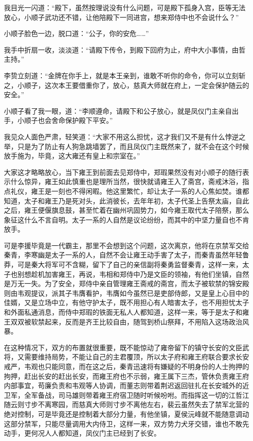 我目光一闪道：“殿下，虽然按理说没有什么问题，可是殿下孤身入宫，臣等无法放心，小顺子武功还不错，让他陪殿下一同进宫，想来郑侍中也不会说什么？”

小顺子脸色一边，脱口道：“公子，你的安危……”

我手中折扇一收，淡淡道：“请殿下传令，到殿下回府为止，府中大小事情，由哲主持。”

李贽立刻道：“金牌在你手上，就是本王亲到，谁敢不听你的命令，你可以立刻斩之，小顺子，这次本王要借重你了，放心，慈真大师就在府上，一定会保护随云的安全。”

小顺子看了我一眼，道：“李顺遵命，请殿下和公子放心，就是凤仪门主亲自出手，小顺子也会舍命保护殿下平安。”

我见众人面色严肃，轻笑道：“大家不用这么担忧，这才我们又不是有什么悖逆之举，只是为了防止有人狗急跳墙罢了，而且凤仪门主既然来了，就不会在这个时候放手施为，毕竟，这大雍还有皇上和宗室在。”

大家这才略略放心，当下雍王到前面去见郑侍中，郑瑕果然没有对小顺子的随行表示什么惊异，雍王如此慎重也是理所当然，很快就请雍王入了斋宫，斋戒沐浴，指点礼仪，雍王是一刻也不得闲暇。他这里繁忙，却让太子一系的人心焦如焚。谁都知道，太子和雍王乃是死对头，此消彼长，去年年初，太子代圣上告祭太庙，自此之后，雍王便偃旗息鼓，甚至忙着在幽州巩固势力，如今雍王取代太子陪祭，那么象征这什么不言自明。太子一系的人自然是议论纷纷，而其中的中坚力量自也不肯放手。

可是李援毕竟是一代霸主，那里不会想到这个问题，这次离京，他将在京禁军交给秦青，李寒幽是太子一系的人，自然不会让雍王动手害了太子，而秦青虽然年轻鲁莽，可是秦大将军可不含糊，留下了自己的亲信副将秦勇监督秦青，这样一来，太子也别想趁机加害雍王，再说，韦相和郑侍中乃是文臣的领袖，有他们坐镇，自然是万无一失。为了安全，郑侍中亲自管理雍王斋戒的斋宫，而太子被软禁的锦安殿则由韦观提议，派其子韦膺看护，韦膺如今虽然已是吏部侍郎，又是皇上心目中的佳婿，又是立场中立，有他守护太子，既不用担心有人暗害太子，也不用担忧太子和外面私通消息，而侍中郑瑕的铁面无私人人都知道，这样一来，等于是太子和雍王双双被软禁起来，反而是齐王比较自由，随驾到桥山祭拜，不用陷入这场政治风暴。

在这种情况下，双方的布置就很重要，既不能惊动了雍帝留下的镇守长安的文臣武将，又需要维持局势，不能让自己的主君覆顶，所以太子府和雍王府联合要求长安戒严，韦观也只能同意，而在这之后，秦青迅速将有嫌疑的不明身份的人士拘押的拘押，赶出长安的赶出长安，而雍王府也不示弱，雍王属下三杰，管休负责雍王府内部事宜，苟廉负责和韦观等人协调，而董志则带着荆迟返回驻扎在长安城外的近卫军，全军备战，司马雄则带着雍王府宿卫随时听候吩咐。而指挥这一切的江哲江随云则寸步不离寒园，而慈真大师则寸步不离他左右，裴云虽然失去了禁军北营的绝对控制，可是毕竟还是控制着大部分力量，有他坐镇，夏侯沅峰就不能随意调动这部分禁军，只能尽量调用大内侍卫，这样一来，双方势力犬牙交错，谁也不敢先动手，更何况人人都知道，凤仪门主已经到了长安。

